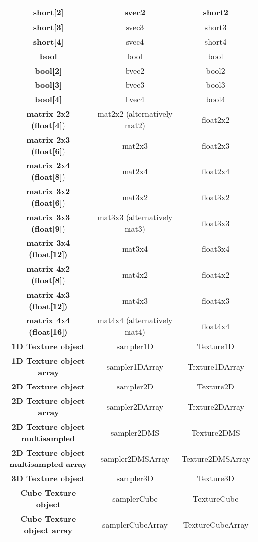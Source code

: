 \documentclass{article}
\begin{document}
\begin{table}[hp]
{\begin{tabular} { | c | c | c | }
	\textbf{short[2]} & svec2 & short2 \\ \hline
	\textbf{short[3]} & svec3 & short3 \\ \hline
	\textbf{short[4]} & svec4 & short4 \\ \hline
	\textbf{bool} & bool & bool \\ \hline
	\textbf{bool[2]} & bvec2 & bool2 \\ \hline
	\textbf{bool[3]} & bvec3 & bool3 \\ \hline
	\textbf{bool[4]} & bvec4 & bool4 \\ \hline
	\textbf{matrix 2x2 (float[4])} & mat2x2 (alternatively mat2) & float2x2 \\ \hline
	\textbf{matrix 2x3 (float[6])} & mat2x3 & float2x3 \\ \hline
	\textbf{matrix 2x4 (float[8])} & mat2x4 & float2x4 \\ \hline
	\textbf{matrix 3x2 (float[6])} & mat3x2 & float3x2 \\ \hline
	\textbf{matrix 3x3 (float[9])} & mat3x3 (alternatively mat3) & float3x3 \\ \hline
	\textbf{matrix 3x4 (float[12])} & mat3x4 & float3x4 \\ \hline
	\textbf{matrix 4x2 (float[8])} & mat4x2 & float4x2 \\ \hline
	\textbf{matrix 4x3 (float[12])} & mat4x3 & float4x3 \\ \hline
	\textbf{matrix 4x4 (float[16])} & mat4x4 (alternatively mat4) & float4x4 \\ \hline
	\textbf{1D Texture object} & sampler1D & Texture1D \\ \hline
	\textbf{1D Texture object array} & sampler1DArray & Texture1DArray \\ \hline
	\textbf{2D Texture object} & sampler2D & Texture2D \\ \hline
	\textbf{2D Texture object array} & sampler2DArray & Texture2DArray \\ \hline
	\textbf{2D Texture object multisampled} & sampler2DMS & Texture2DMS \\ \hline
	\textbf{2D Texture object multisampled array} & sampler2DMSArray & Texture2DMSArray \\ \hline
	\textbf{3D Texture object} & sampler3D & Texture3D \\ \hline
	\textbf{Cube Texture object} & samplerCube & TextureCube \\ \hline
	\textbf{Cube Texture object array} & samplerCubeArray & TextureCubeArray \\ \hline

\end{tabular}}
\end{table}
\end{document}
